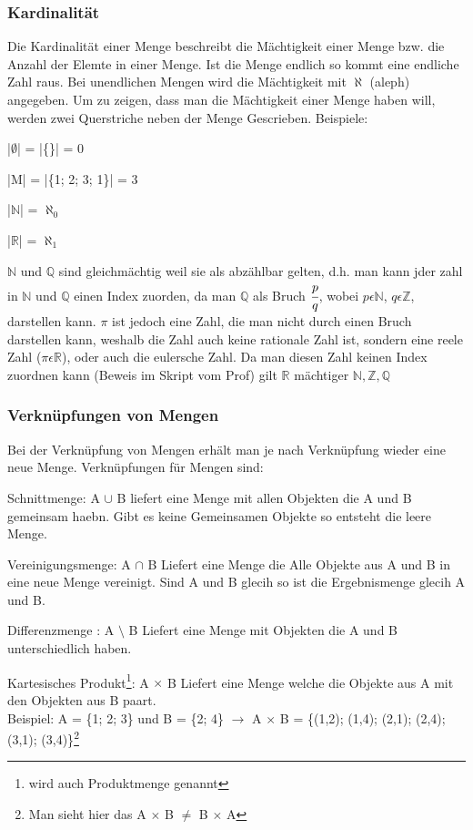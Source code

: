 \documentclass[a4paper,10pt]{scrartcl}
\begin{document}
        \subsubsection{Kardinalität}
        Die Kardinalität einer Menge beschreibt die Mächtigkeit einer Menge bzw. die Anzahl der Elemte in einer Menge. Ist die Menge endlich so kommt eine endliche Zahl raus.
        Bei unendlichen Mengen wird die Mächtigkeit mit $\aleph$ (aleph) angegeben. Um zu zeigen, dass man die Mächtigkeit einer Menge haben will, werden zwei Querstriche
        neben der Menge Gescrieben. Beispiele: 
        \begin{description}
            \item |$\emptyset$| = |\{\}| = 0
            \item |M| = |\{1; 2; 3; 1\}| = 3
            \item |$\mathbb{N}$| = $\aleph_0$
            \item |$\mathbb{R}$| = $\aleph_1$ 
        \end{description}
        $\mathbb{N}$ und $\mathbb{Q}$ sind gleichmächtig weil sie als abzählbar gelten, d.h. man kann jder zahl in $\mathbb{N}$ und $\mathbb{Q}$ einen Index zuorden, 
        da man $\mathbb{Q}$ als Bruch $\cfrac{p}{q}$, wobei $p \epsilon \mathbb{N}$, $q \epsilon \mathbb{Z}$, darstellen kann. $\pi$ ist jedoch eine Zahl, die man nicht durch einen Bruch
        darstellen kann, weshalb die Zahl auch keine rationale Zahl ist, sondern eine reele Zahl ($\pi \epsilon \mathbb{R}$), oder auch die eulersche Zahl. Da man diesen Zahl keinen Index zuordnen kann
        (Beweis im Skript vom Prof) gilt $\mathbb{R}$ mächtiger $\mathbb{N,Z,Q}$

        \subsubsection{Verknüpfungen von Mengen}
        Bei der Verknüpfung von Mengen erhält man je nach Verknüpfung wieder eine neue Menge. Verknüpfungen für Mengen sind:
        \begin{description}
            \item Schnittmenge:
                   A $\cup$ B liefert eine Menge mit allen Objekten die A und B gemeinsam haebn. Gibt es keine Gemeinsamen Objekte so entsteht die leere Menge. 
            \item Vereinigungsmenge: 
                   A $\cap$ B Liefert eine Menge die Alle Objekte aus A und B in eine neue Menge vereinigt. Sind A und B glecih so ist die Ergebnismenge glecih A und B. 
            \item Differenzmenge :
                   A $\setminus$ B Liefert eine Menge mit Objekten die A und B unterschiedlich haben.
            \item Kartesisches Produkt\footnote{wird auch Produktmenge genannt}:
                   A $\times$ B Liefert eine Menge welche die Objekte aus A mit den Objekten aus B paart.\\
                   Beispiel: A = \{1; 2; 3\} und B = \{2; 4\} $\rightarrow$ A $\times$ B = \{(1,2); (1,4); (2,1); (2,4); (3,1); (3,4)\}\footnote{
                   Man sieht hier das A $\times$ B $\neq$ B $\times$ A}
        \end{description}
\end{document}
